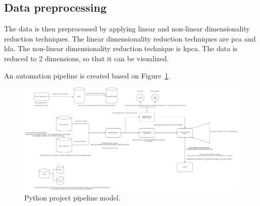 \subsection{Data preprocessing}\label{subsec:data-preprocessing}
The data is then preprocessed by applying linear and non-linear dimensionality reduction techniques. The linear dimensionality reduction techniques are \gls{pca} and \gls{lda}. The non-linear dimensionality reduction technique is \gls{kpca}. The data is reduced to 2 dimensions, so that it can be visualized.







An automation pipeline is created based on Figure~\ref{fig:python-pipeline-model}.


\begin{figure}[htb!]
    \centering
    \includegraphics[width=\textwidth]{figures/pipeline-draft.png}
    \caption{Python project pipeline model.}
    \label{fig:python-pipeline-model}
\end{figure}


